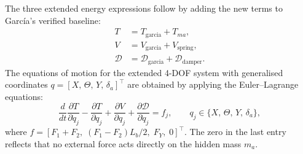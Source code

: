 \documentclass{article}
\begin{document}
The three extended energy expressions follow by adding the new terms
to Garc\'ia's verified baseline:
%
\begin{align}
    T                   &= T_\text{garcia} + T_{ma},                   \\
    V                   &= V_\text{garcia} + V_\text{spring},           \\
    \mathcal{D}         &= \mathcal{D}_\text{garcia} + \mathcal{D}_\text{damper}.
\end{align}
%
The equations of motion for the extended 4-DOF system with generalised
coordinates $q = [X,\,\Theta,\,Y,\,\delta_a]^\top$ are obtained by
applying the Euler--Lagrange equations:
%
\begin{equation}
    \frac{d}{dt}\frac{\partial T}{\partial \dot{q}_j}
    - \frac{\partial T}{\partial q_j}
    + \frac{\partial V}{\partial q_j}
    + \frac{\partial \mathcal{D}}{\partial \dot{q}_j}
    = f_j, \qquad q_j \in \{X,\,\Theta,\,Y,\,\delta_a\},
\end{equation}
%
where $f = [F_1+F_2,\;(F_1-F_2)L_b/2,\;F_Y,\;0]^\top$. The zero in the
last entry reflects that no external force acts directly on the hidden
mass $m_a$.
\end{document}
